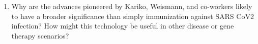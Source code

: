 \documentclass[basic]{inVerba-notes}
\begin{document}
\begin{enumerate}[align=left, leftmargin=0pt, labelindent=\parindent, listparindent=\parindent, labelwidth=0pt, itemindent=!]
\begin{enumerate}
    \item {} Why are the advances pioneered by Kariko, Weismann, and co-workers likely to have a broader significance than simply immunization against SARS CoV2 infection? How might this technology be useful in other disease or gene therapy scenarios?
    \basec{\begin{itemize}
      \item 
    \end{itemize}}
    
  \end{enumerate}
\end{enumerate}
\end{document}
